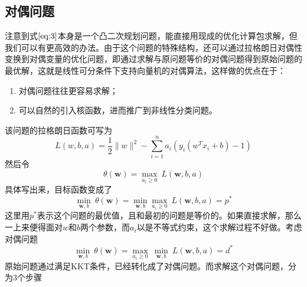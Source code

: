 \subsection*{对偶问题}
注意到式$\ref{eq:3}$本身是一个凸二次规划问题，能直接用现成的优化计算包求解，但我们可以有更高效的办法。由于这个问题的特殊结构，还可以通过拉格朗日对偶性变换到对偶变量的优化问题，即通过求解与原问题等价的对偶问题得到原始问题的最优解，这就是线性可分条件下支持向量机的对偶算法，这样做的优点在于：
\begin{enumerate}
	\item 对偶问题往往更容易求解；
	\item 可以自然的引入核函数，进而推广到非线性分类问题。	
\end{enumerate}
该问题的拉格朗日函数可写为
\begin{equation}
L(w,b,a) = \frac{1}{2}\lVert w \rVert^2 - \sum_{i=1}^na_i (y_i(w^T x_i + b) - 1)
\end{equation}
然后令
\begin{equation}
\theta (\boldsymbol{w}) = \mathop{max} \limits_{a_i \geq 0}\ L(\boldsymbol{w},b,a)
\end{equation}
具体写出来，目标函数变成了
\begin{equation}
\mathop{min}\limits_{\boldsymbol{w},b}\ \theta(\boldsymbol{w}) = \mathop{min}\limits_{\boldsymbol{w},b}\mathop{ max}\limits_{a_i \geq 0}\ L(\boldsymbol{w},b,a) = p^*
\end{equation}
这里用$p^*$表示这个问题的最优值，且和最初的问题是等价的。如果直接求解，那么一上来便得面对$w$和$b$两个参数，而$a_i$以是不等式约束，这个求解过程不好做。考虑对偶问题
\begin{equation}
\mathop{min}\limits_{\boldsymbol{w},b}\ \theta(\boldsymbol{w}) = \mathop{ max}\limits_{a_i \geq 0}\ \mathop{min}\limits_{\boldsymbol{w},b}\ L(\boldsymbol{w},b,a) = d^*
\end{equation}
原始问题通过满足KKT条件，已经转化成了对偶问题。而求解这个对偶问题，分为3个步骤
